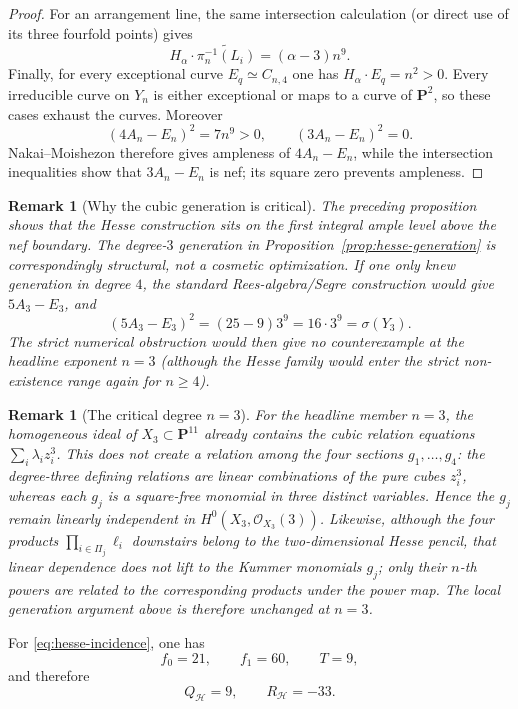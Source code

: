 \documentclass[11pt]{article}
\newtheorem{remark}[theorem]{Remark}
\newcommand{\PP}{\mathbf P}
\newcommand{\OO}{\mathcal O}
\newcommand{\cH}{\mathcal H}
\newcommand{\sig}{\sigma}
\begin{document}
\begin{proof}
For an arrangement line, the same intersection calculation (or direct use of
its three fourfold points) gives
\[
       H_{\alpha}\cdot\widetilde{\pi_n^{-1}(L_i)}
       =(\alpha-3)n^9.
\]
Finally, for every exceptional curve $E_q\simeq C_{n,4}$ one has
$H_{\alpha}\cdot E_q=n^2>0$.  Every irreducible curve on $Y_n$ is either
exceptional or maps to a curve of $\PP^2$, so these cases exhaust the curves.
Moreover
\[
      (4A_n-E_n)^2=7n^9>0,
      \qquad
      (3A_n-E_n)^2=0.
\]
Nakai--Moishezon therefore gives ampleness of $4A_n-E_n$, while the intersection
inequalities show that $3A_n-E_n$ is nef; its square zero prevents ampleness.
\end{proof}

\begin{remark}[Why the cubic generation is critical]\label{rem:hesse-sharp-degree}
The preceding proposition shows that the Hesse construction sits on the first
integral ample level above the nef boundary.  The degree-$3$ generation in
Proposition~\ref{prop:hesse-generation} is correspondingly structural, not a
cosmetic optimization.  If one only knew generation in degree $4$, the standard
Rees-algebra/Segre construction would give $5A_3-E_3$, and
\[
       (5A_3-E_3)^2=(25-9)3^9=16\cdot3^9=\sig(Y_3).
\]
The strict numerical obstruction would then give no counterexample at the
headline exponent $n=3$ (although the Hesse family would enter the strict
non-existence range again for $n\ge4$).
\end{remark}

\begin{remark}[The critical degree $n=3$]\label{rem:hesse-n3-degree}
For the headline member $n=3$, the homogeneous ideal of
$X_3\subset\PP^{11}$ already contains the cubic relation equations
$\sum_i\lambda_i z_i^3$.  This does not create a relation among the four
sections $g_1,\ldots,g_4$: the degree-three defining relations are linear
combinations of the pure cubes $z_i^3$, whereas each $g_j$ is a square-free
monomial in three distinct variables.  Hence the $g_j$ remain linearly
independent in $H^0(X_3,\OO_{X_3}(3))$.  Likewise, although the four products
$\prod_{i\in\Pi_j}\ell_i$ downstairs belong to the two-dimensional Hesse pencil,
that linear dependence does not lift to the Kummer monomials $g_j$; only their
$n$-th powers are related to the corresponding products under the power map.
The local generation argument above is therefore unchanged at $n=3$.
\end{remark}

For \eqref{eq:hesse-incidence}, one has
\[
 f_0=21,\qquad f_1=60,\qquad T=9,
\]
and therefore
\[
 Q_{\cH}=9,\qquad R_{\cH}=-33.
\]
\end{document}
